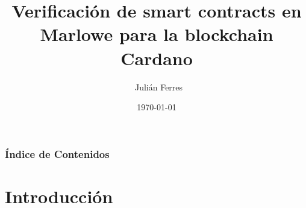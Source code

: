 \documentclass{beamer}
\title[Verificación de smart contracts en Marlowe]%
{Verificación de smart contracts en Marlowe para la blockchain Cardano}
\author[Julián Ferres] %
{~Julián Ferres}
\institute[FIUBA] %
{
  Facultad de Ingeniería\\Universidad de Buenos Aires.
}
\date{\today}
\begin{document}



\begin{frame}
	\titlepage
\end{frame}


\begin{frame} 
	\footnotesize
	\frametitle{Índice de Contenidos}
	\tableofcontents
\end{frame}

%
%
%
%
%
%
%
%

\section{Introducción}
\end{document}
